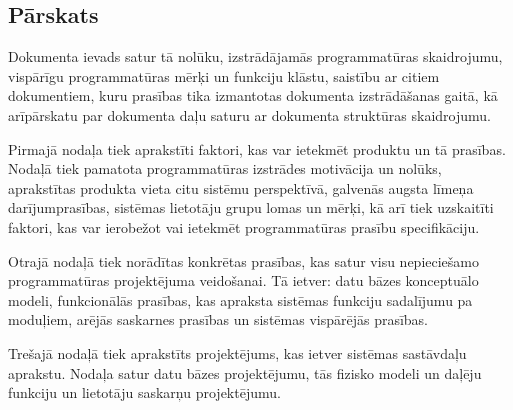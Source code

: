 \subsection*{Pārskats}

Dokumenta ievads satur tā nolūku, izstrādājamās programmatūras skaidrojumu,
vispārīgu programmatūras mērķi un funkciju klāstu, saistību ar citiem
dokumentiem, kuru prasības tika izmantotas dokumenta izstrādāšanas gaitā, kā
arīpārskatu par dokumenta daļu saturu ar dokumenta struktūras skaidrojumu.

Pirmajā nodaļa tiek aprakstīti faktori, kas var ietekmēt produktu un tā
prasības. Nodaļā tiek pamatota programmatūras izstrādes motivācija un nolūks,
aprakstītas produkta vieta citu sistēmu perspektīvā, galvenās augsta līmeņa
darījumprasības, sistēmas lietotāju grupu lomas un mērķi, kā arī tiek
uzskaitīti faktori, kas var ierobežot vai ietekmēt programmatūras prasību
specifikāciju.

Otrajā nodaļā tiek norādītas konkrētas prasības, kas satur visu nepieciešamo
programmatūras projektējuma veidošanai. Tā ietver: datu bāzes konceptuālo
modeli, funkcionālās prasības, kas apraksta sistēmas funkciju sadalījumu pa
moduļiem, arējās saskarnes prasības un sistēmas vispārējās prasības.

Trešajā nodaļā tiek aprakstīts projektējums, kas ietver sistēmas sastāvdaļu
aprakstu. Nodaļa satur datu bāzes projektējumu, tās fizisko modeli un daļēju
funkciju un lietotāju saskarņu projektējumu. 
